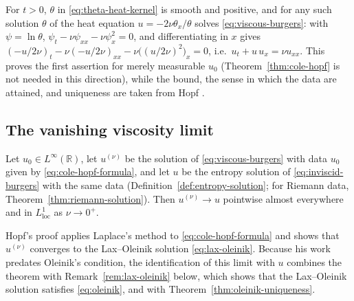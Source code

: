 \noindent For $t>0$, $\theta$ in \eqref{eq:theta-heat-kernel} is smooth and
positive, and for any such solution $\theta$ of the heat equation
$u=-2\nu\theta_x/\theta$ solves \eqref{eq:viscous-burgers}: with
$\psi=\ln\theta$, $\psi_t-\nu\psi_{xx}-\nu\psi_x^2=0$, and differentiating in
$x$ gives $(-u/2\nu)_t-\nu(-u/2\nu)_{xx}-\nu\big((u/2\nu)^2\big)_x=0$, i.e.\
$u_t+u\,u_x=\nu u_{xx}$. This proves the first assertion for merely measurable
$u_0$ (Theorem~\ref{thm:cole-hopf} is not needed in this direction), while the
bound, the sense in which the data are attained, and uniqueness are taken from
Hopf \cite{hopf1950}.

\subsection{The vanishing viscosity limit}
\label{subsec:vanishing-viscosity}

\begin{theorem}
\label{thm:vanishing-viscosity}
Let $u_0\in L^\infty(\mathbb{R})$, let $u^{(\nu)}$ be the solution of
\eqref{eq:viscous-burgers} with data $u_0$ given by
\eqref{eq:cole-hopf-formula}, and let $u$ be the entropy solution of
\eqref{eq:inviscid-burgers} with the same data
(Definition~\ref{def:entropy-solution}; for Riemann data,
Theorem~\ref{thm:riemann-solution}). Then $u^{(\nu)} \to u$ pointwise almost
everywhere and in $L^1_{\mathrm{loc}}$ as $\nu \to 0^+$.
\end{theorem}

Hopf's proof \cite{hopf1950} applies Laplace's method to
\eqref{eq:cole-hopf-formula} and shows that $u^{(\nu)}$ converges to the
Lax--Oleinik solution \eqref{eq:lax-oleinik}. Because his work predates Oleinik's
condition, the identification of this limit with $u$ combines the theorem with
Remark~\ref{rem:lax-oleinik} below, which shows that the Lax--Oleinik solution
satisfies \eqref{eq:oleinik}, and with Theorem~\ref{thm:oleinik-uniqueness}.

